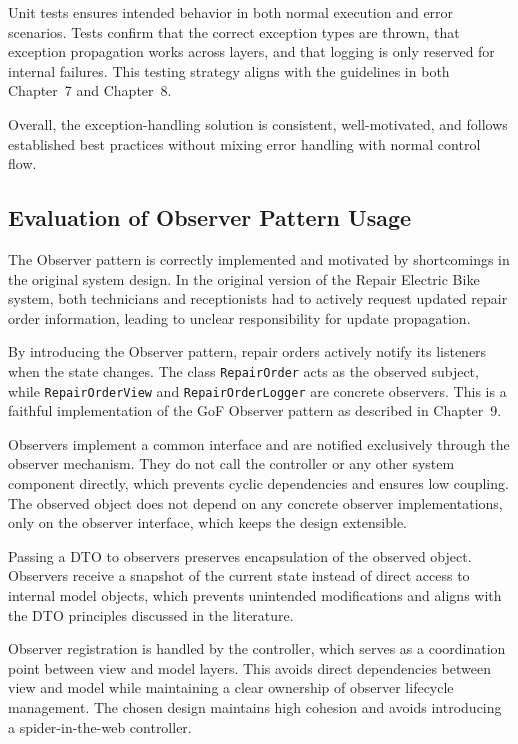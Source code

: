 \documentclass[a4paper]{scrartcl}
\begin{document}
Unit tests ensures intended behavior in both normal execution and error scenarios. Tests confirm that the correct exception types are thrown, that exception propagation works across layers, and that logging is only reserved for internal failures. This testing strategy aligns with the guidelines in both Chapter~7 and Chapter~8.

Overall, the exception-handling solution is consistent, well-motivated, and follows established best practices without mixing error handling with normal control flow.

\subsection{Evaluation of Observer Pattern Usage}

The Observer pattern is correctly implemented and motivated by shortcomings in the original system design. In the original version of the Repair Electric Bike system, both technicians and receptionists had to actively request updated repair order information, leading to unclear responsibility for update propagation.

By introducing the Observer pattern, repair orders actively notify its listeners when the state changes. The class \texttt{RepairOrder} acts as the observed subject, while \texttt{RepairOrderView} and \texttt{RepairOrderLogger} are concrete observers. This is a faithful implementation of the GoF Observer pattern as described in Chapter~9.

Observers implement a common interface and are notified exclusively through the observer mechanism. They do not call the controller or any other system component directly, which prevents cyclic dependencies and ensures low coupling. The observed object does not depend on any concrete observer implementations, only on the observer interface, which keeps the design extensible.

Passing a DTO to observers preserves encapsulation of the observed object. Observers receive a snapshot of the current state instead of direct access to internal model objects, which prevents unintended modifications and aligns with the DTO principles discussed in the literature.

Observer registration is handled by the controller, which serves as a coordination point between view and model layers. This avoids direct dependencies between view and model while maintaining a clear ownership of observer lifecycle management. The chosen design maintains high cohesion and avoids introducing a spider-in-the-web controller.
\end{document}
